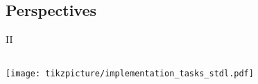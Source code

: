 \documentclass[../main.tex]{subfiles}
\begin{document}
\subsection*{Perspectives}
\begin{frame}{\subsecname{} II}
  \begin{columns}
    \begin{column}{.9 \linewidth}
      \centering
      \texttt{[image: tikzpicture/implementation\_tasks\_stdl.pdf]}
    \end{column}
  \end{columns}
\end{frame}
\end{document}
